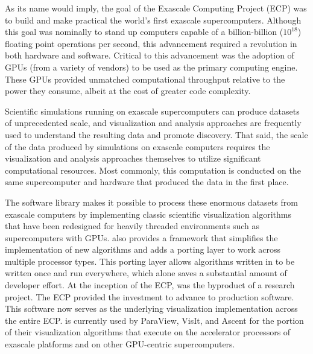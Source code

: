 As its name would imply, the goal of the Exascale Computing Project (ECP) was to build and make practical the world's first exascale supercomputers.
Although this goal was nominally to stand up computers capable of a billion-billion ($10^{18}$) floating point operations per second, this advancement required a revolution in both hardware and software.
Critical to this advancement was the adoption of GPUs (from a variety of vendors) to be used as the primary computing engine.
These GPUs provided unmatched computational throughput relative to the power they consume, albeit at the cost of greater code complexity.%

Scientific simulations running on exascale supercomputers can produce datasets of unprecedented
scale, and
visualization and analysis approaches are frequently used to understand the resulting
data and promote discovery.
%
That said, the scale of the data produced by simulations on exascale computers requires
the visualization and analysis approaches themselves to utilize significant computational resources.
%
Most commonly, this computation is conducted on the same supercomputer and hardware that produced
the data in the first place.

The \vtkm software library makes it possible to process these enormous datasets from exascale computers
by implementing classic scientific visualization algorithms that have been redesigned for heavily threaded environments such as supercomputers with GPUs.
\vtkm also provides a framework that simplifies the implementation of new algorithms and adds a porting layer to work across multiple processor types.
This porting layer allows algorithms written in \vtkm to be written once and run everywhere, which alone saves a substantial amount of developer effort.
At the inception of the ECP, \vtkm was the byproduct of a research project.
The ECP provided the investment to advance \vtkm to production software.
This software now serves as the underlying visualization implementation across the entire ECP.
\vtkm is currently used by ParaView, VisIt, and Ascent for the portion of their visualization algorithms that execute on the accelerator processors of exascale platforms and on other GPU-centric supercomputers.

